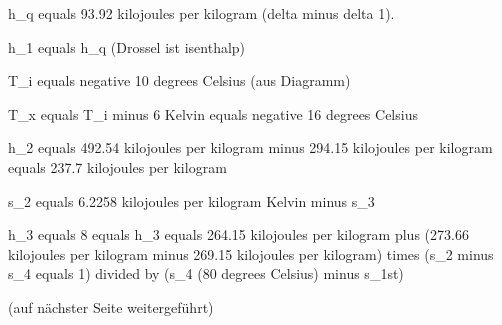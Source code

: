 h_q equals 93.92 kilojoules per kilogram (delta minus delta 1).

h_1 equals h_q (Drossel ist isenthalp)

T_i equals negative 10 degrees Celsius (aus Diagramm)

T_x equals T_i minus 6 Kelvin equals negative 16 degrees Celsius

h_2 equals 492.54 kilojoules per kilogram minus 294.15 kilojoules per kilogram equals 237.7 kilojoules per kilogram

s_2 equals 6.2258 kilojoules per kilogram Kelvin minus s_3

h_3 equals 8 equals h_3 equals 264.15 kilojoules per kilogram plus (273.66 kilojoules per kilogram minus 269.15 kilojoules per kilogram) times (s_2 minus s_4 equals 1) divided by (s_4 (80 degrees Celsius) minus s_1st)

(auf nächster Seite weitergeführt)